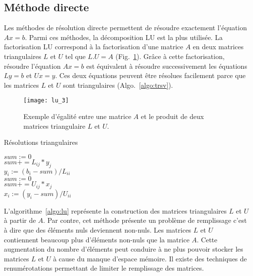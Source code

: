 \subsection{Méthode directe}
Les méthodes de résolution directe permettent de résoudre exactement l'équation $Ax=b$.
%
Parmi ces méthodes, la décomposition LU est la plus utilisée.
%
La factorisation LU correspond à la factorisation d'une matrice $A$ en deux matrices triangulaires $L$ et $U$ tel que $L.U=A$ (Fig.~\ref{fig:lu_3}).
%
Grâce à cette factorisation, résoudre l'équation $Ax=b$ est équivalent à résoudre successivement les équations $Ly=b$ et $Ux=y$.
%
Ces deux équations peuvent être résolues facilement parce que les matrices $L$ et $U$ sont triangulaires (Algo.~\ref{algo:trsv}).

\begin{figure}[!h]
  \centering
  \texttt{[image: lu\_3]}
  \caption{Exemple d'égalité entre une matrice $A$ et le produit de deux matrices triangulaire $L$ et $U$.}
  \label{fig:lu_3}
\end{figure}

\begin{algorithm}
  \caption{Résolutions triangulaires}
  \label{algo:trsv}
   {
    $sum := 0$\\
     {
      $sum += L_{ij} * y_j$ \\
    }
    $y_i := (b_i-sum)/L_{ii}$ \\
  }
   {
    $sum := 0$\\
     {
      $sum += U_{ij} * x_j$ \\
    }
    $x_i := (y_i-sum)/U_{ii}$ \\
  }
\end{algorithm}

L'algorithme~\ref{algo:lu} représente la construction des matrices triangulaires $L$ et $U$ à partir de $A$.
%
Par contre, cet méthode présente un problème de remplissage c'est à dire que des éléments nuls deviennent non-nuls.
%
Les matrices $L$ et $U$ contiennent beaucoup plus d'éléments non-nuls que la matrice $A$.
%
Cette augmentation du nombre d'éléments peut conduire à ne plus pouvoir stocker les matrices $L$ et $U$ à cause du manque d'espace mémoire.
%
Il existe des techniques de renumérotations permettant de limiter le remplissage des matrices\cite{faverge_thesis}.


